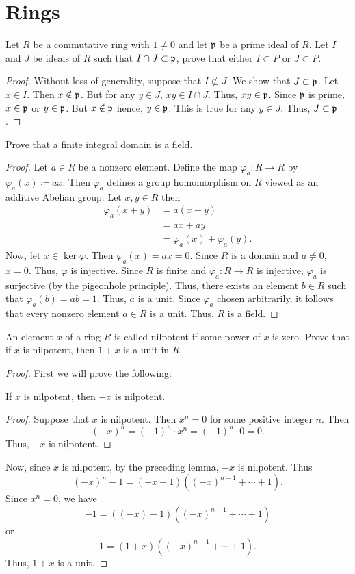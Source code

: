 \section{Rings}
\begin{problem}
Let $R$ be a commutative ring with $1\neq 0$ and let $\mathfrak{p}$ be a
prime ideal of $R$. Let $I$ and $J$ be ideals of $R$ such that $I\cap
J\subset\mathfrak{p}$, prove that either $I\subset P$ or $J\subset P$.
\end{problem}
\begin{proof}
Without loss of generality, suppose that $I\nsubset J$. We show that
$J\subset\mathfrak{p}$. Let $x\in I$. Then $x\notin\mathfrak{p}$. But for any $y\in J$,
$xy\in I\cap J$. Thus, $xy\in\mathfrak{p}$. Since $\mathfrak{p}$ is prime, $x\in\mathfrak{p}$
or $y\in\mathfrak{p}$. But $x\notin\mathfrak{p}$ hence, $y\in\mathfrak{p}$. This is true for
any $y\in J$. Thus, $J\subset\mathfrak{p}$.
\end{proof}
\begin{problem}
Prove that a finite integral domain is a field.
\end{problem}
\begin{proof}
Let $a\in R$ be a nonzero element. Define the map $\varphi_a\colon R\to R$
by $\varphi_a(x)\coloneqq ax$. Then $\varphi_a$ defines a group
homomorphism on $R$ viewed as an additive Abelian group: Let $x,y\in R$
then
\begin{align*}
\varphi_a(x+y)&=a(x+y)\\
&=ax+ay\\
&=\varphi_a(x)+\varphi_a(y).
\end{align*}
Now, let $x\in\ker\varphi$. Then $\varphi_a(x)=ax=0$. Since $R$ is a domain
and $a\neq 0$, $x=0$. Thus, $\varphi$ is injective. Since $R$ is finite and
$\varphi_a\colon R\to R$ is injective, $\varphi_a$ is surjective (by the
pigeonhole principle). Thus, there exists an element $b\in R$ such that
$\varphi_a(b)=ab=1$. Thus, $a$ is a unit. Since $\varphi_a$ chosen
arbitrarily, it follows that every nonzero element $a\in R$ is a
unit. Thus, $R$ is a field.
\end{proof}

\begin{problem}
An element $x$ of a ring $R$ is called nilpotent if some power of $x$ is
zero. Prove that if $x$ is nilpotent, then $1+x$ is a unit in $R$.
\end{problem}
\begin{proof}
First we will prove the following:
\begin{lemma}
If $x$ is nilpotent, then $-x$ is nilpotent.
\end{lemma}
\begin{proof}
\renewcommand\qedsymbol{$\clubsuit$}
Suppose that $x$ is nilpotent. Then $x^n=0$ for some positive integer
$n$. Then
\[
(-x)^n=(-1)^n\cdot x^n=(-1)^n\cdot 0=0.
\]
Thus, $-x$ is nilpotent.
\end{proof}
Now, since $x$ is nilpotent, by the preceding lemma, $-x$ is
nilpotent. Thus
\[
(-x)^n-1=(-x-1)((-x)^{n-1}+\cdots+1).
\]
Since $x^n=0$, we have
\[
-1=((-x)-1)((-x)^{n-1}+\cdots+1)
\]
or
\[
1=(1+x)((-x)^{n-1}+\cdots+1).
\]
Thus, $1+x$ is a unit.
\end{proof}

